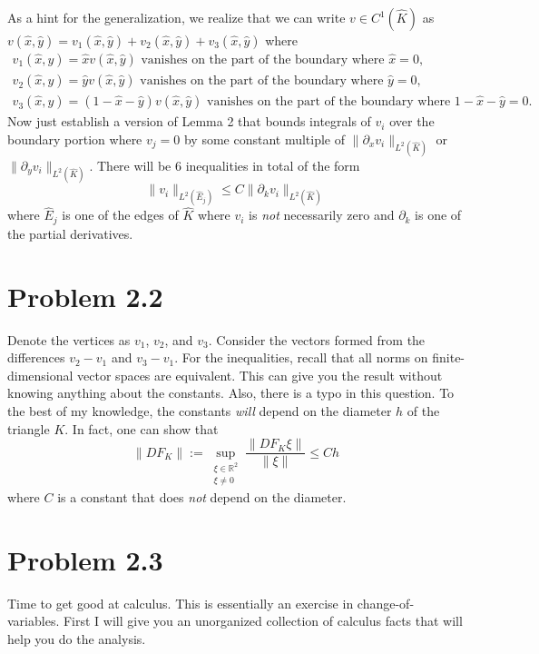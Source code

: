 \documentclass{article}
\theoremstyle{definition}
\theoremstyle{plain}
\theoremstyle{remark}
\begin{document}
As a hint for the generalization, we realize that we can write $v \in C^1(\widehat K)$ as $v(\widehat x, \widehat y) = v_1(\widehat x, \widehat y) + v_2(\widehat x, \widehat y) + v_3(\widehat x, \widehat y)$ where
\begin{align*}
	v_1(\widehat x, \widehat y) = \widehat xv(\widehat x, \widehat y) \text{ vanishes on the part of the boundary where } \widehat x = 0, \\
	v_2(\widehat x, \widehat y) = \widehat yv(\widehat x, \widehat y) \text{ vanishes on the part of the boundary where } \widehat y = 0, \\
	v_3(\widehat x, \widehat y) = (1 - \widehat x - \widehat y)v(\widehat x, \widehat y) \text{ vanishes on the part of the boundary where } 1 - \widehat x - \widehat y = 0.
\end{align*}
Now just establish a version of Lemma 2 that bounds integrals of $v_i$ over the boundary portion where $v_j = 0$ by some constant multiple of $\|\partial_x v_i\|_{L^2(\widehat K)}$ or $\|\partial_y v_i\|_{L^2(\widehat K)}$.
There will be 6 inequalities in total of the form
\begin{equation*}
	\|v_i\|_{L^2(\widehat E_j)} \leq C\|\partial_k v_i\|_{L^2(\widehat K)}
\end{equation*}
where $\widehat E_j$ is one of the edges of $\widehat K$ where $v_i$ is \emph{not} necessarily zero and $\partial_k$ is one of the partial derivatives.

\section*{Problem 2.2}
Denote the vertices as $v_1$, $v_2$, and $v_3$.
Consider the vectors formed from the differences $v_2 - v_1$ and $v_3 - v_1$.
For the inequalities, recall that all norms on finite-dimensional vector spaces are equivalent.
This can give you the result without knowing anything about the constants.
Also, there is a typo in this question.
To the best of my knowledge, the constants \emph{will} depend on the diameter $h$ of the triangle $K$.
In fact, one can show that
\[\|DF_K\| := \sup_{\substack{\xi \in \mathbb R^2\\\xi \neq 0}} \frac{\|DF_K\xi\|}{\|\xi\|} \leq Ch\]
where $C$ is a constant that does \emph{not} depend on the diameter.

\section*{Problem 2.3}
Time to get good at calculus.
This is essentially an exercise in change-of-variables.
First I will give you an unorganized collection of calculus facts that will help you do the analysis.
\end{document}
